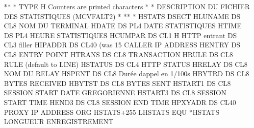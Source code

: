 \documentclass[letterpaper,10pt,english]{sphinxmanual}
\begin{document}
\begin{sphinxVerbatim}[commandchars=\\\{\}]
*\PYGZhy{}\PYGZhy{}\PYGZhy{}\PYGZhy{}\PYGZhy{}\PYGZhy{}\PYGZhy{}\PYGZhy{}\PYGZhy{}\PYGZhy{}\PYGZhy{}\PYGZhy{}\PYGZhy{}\PYGZhy{}\PYGZhy{}\PYGZhy{}\PYGZhy{}\PYGZhy{}\PYGZhy{}\PYGZhy{}\PYGZhy{}\PYGZhy{}\PYGZhy{}\PYGZhy{}\PYGZhy{}\PYGZhy{}\PYGZhy{}\PYGZhy{}\PYGZhy{}\PYGZhy{}\PYGZhy{}\PYGZhy{}\PYGZhy{}\PYGZhy{}\PYGZhy{}\PYGZhy{}\PYGZhy{}\PYGZhy{}\PYGZhy{}\PYGZhy{}\PYGZhy{}\PYGZhy{}\PYGZhy{}\PYGZhy{}\PYGZhy{}\PYGZhy{}\PYGZhy{}\PYGZhy{}\PYGZhy{}\PYGZhy{}\PYGZhy{}\PYGZhy{}\PYGZhy{}\PYGZhy{}\PYGZhy{}\PYGZhy{}\PYGZhy{}\PYGZhy{}\PYGZhy{}\PYGZhy{}*
*        TYPE H \PYGZhy{} Counters are printed characters            *
*        DESCRIPTION DU FICHIER DES STATISTIQUES (MCVFALT2)  *
*\PYGZhy{}\PYGZhy{}\PYGZhy{}\PYGZhy{}\PYGZhy{}\PYGZhy{}\PYGZhy{}\PYGZhy{}\PYGZhy{}\PYGZhy{}\PYGZhy{}\PYGZhy{}\PYGZhy{}\PYGZhy{}\PYGZhy{}\PYGZhy{}\PYGZhy{}\PYGZhy{}\PYGZhy{}\PYGZhy{}\PYGZhy{}\PYGZhy{}\PYGZhy{}\PYGZhy{}\PYGZhy{}\PYGZhy{}\PYGZhy{}\PYGZhy{}\PYGZhy{}\PYGZhy{}\PYGZhy{}\PYGZhy{}\PYGZhy{}\PYGZhy{}\PYGZhy{}\PYGZhy{}\PYGZhy{}\PYGZhy{}\PYGZhy{}\PYGZhy{}\PYGZhy{}\PYGZhy{}\PYGZhy{}\PYGZhy{}\PYGZhy{}\PYGZhy{}\PYGZhy{}\PYGZhy{}\PYGZhy{}\PYGZhy{}\PYGZhy{}\PYGZhy{}\PYGZhy{}\PYGZhy{}\PYGZhy{}\PYGZhy{}\PYGZhy{}\PYGZhy{}\PYGZhy{}\PYGZhy{}*
*
HSTATS   DSECT
H\PYGZdl{}LUNAME DS    CL8                     NOM DU TERMINAL
H\PYGZdl{}DATE   DS    PL4                     DATE STATISTIQUES
H\PYGZdl{}TIME   DS    PL4                     HEURE STATISTIQUES
H\PYGZdl{}CUMPAR DS    CL1                     H HTTP entrant
         DS    CL3                     filler
H\PYGZdl{}IPADDR DS    CL40  (was 15\PYGZcb{}          CALLER IP ADDRESS
H\PYGZdl{}ENTRY  DS    CL8                     ENTRY POINT
H\PYGZdl{}TRANS  DS    CL8                     TRANSACTION
H\PYGZdl{}RULE   DS    CL8                     RULE (default to LINE)
H\PYGZdl{}STATUS DS    CL4                     HTTP STATUS
H\PYGZdl{}RELAY  DS    CL8                     NOM DU RELAY
H\PYGZdl{}SPENT  DS    CL8                     Durée d\PYGZsq{}appel en 1/100s
H\PYGZdl{}BYTRD  DS    CL8                     BYTES RECEIVED
H\PYGZdl{}BYTST  DS    CL8                     BYTES SENT
H\PYGZdl{}START1 DS    CL8              SESSION START DATE GREGORIENNE
H\PYGZdl{}START3 DS    CL8                     SESSION START TIME
H\PYGZdl{}END3   DS    CL8                     SESSION END TIME
H\PYGZdl{}PXYADR DS    CL40                    PROXY IP ADDRESS
        ORG   HSTATS+255
LHSTATS  EQU   *\PYGZhy{}HSTATS                LONGUEUR ENREGISTREMENT


\end{sphinxVerbatim}
\end{document}
